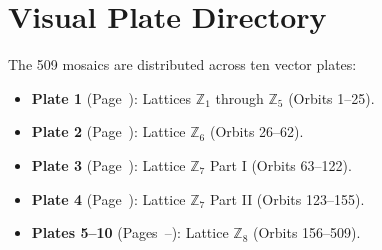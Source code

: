 \section*{Visual Plate Directory}

The 509 mosaics are distributed across ten vector plates:
\begin{itemize}
    \item \textbf{Plate 1} (Page~\pageref{plate:1}): Lattices $\mathbb{Z}_1$ through $\mathbb{Z}_5$ (Orbits 1--25).
    \item \textbf{Plate 2} (Page~\pageref{plate:2}): Lattice $\mathbb{Z}_6$ (Orbits 26--62).
    \item \textbf{Plate 3} (Page~\pageref{plate:3}): Lattice $\mathbb{Z}_7$ Part I (Orbits 63--122).
    \item \textbf{Plate 4} (Page~\pageref{plate:4}): Lattice $\mathbb{Z}_7$ Part II (Orbits 123--155).
    \item \textbf{Plates 5--10} (Pages~\pageref{plate:5}--\pageref{plate:10}): Lattice $\mathbb{Z}_8$ (Orbits 156--509).
\end{itemize}

\clearpage
{}
\label{plate:1}

\label{plate:2}

\label{plate:3}

\label{plate:4}

\label{plate:5}

\label{plate:6}

\label{plate:7}

\label{plate:8}

\label{plate:9}

\label{plate:10}

